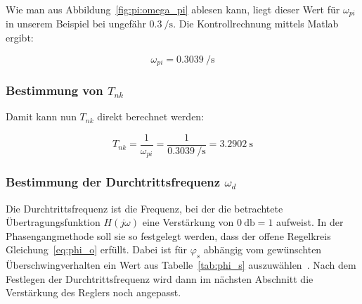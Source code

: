 Wie    man   aus    Abbildung~\ref{fig:pi:omega_pi}   ablesen    kann,   liegt
dieser   Wert  f\"ur   $\omega_{pi}$  in   unserem  Beispiel   bei  ungef\"ahr
$\SI{0.3}{\per\second}$. Die Kontrollrechnung mittels Matlab ergibt:

\begin{equation} \label{eq:pi:omega_pi}
    \omega_{pi} = \SI{0.3039}{\per\second}
\end{equation}


\clearpage
\subsubsection{Bestimmung von $T_{nk}$}
Damit kann nun $T_{nk}$ direkt berechnet werden\footnotemark[5]:

\begin{equation} \label{eq:pi:omega_pi}
    T_{nk} = \frac{1}{\omega_{pi}} = \frac{1}{\SI{0.3039}{\per\second}} = \SI{3.2902}{\second}
\end{equation}



\subsubsection{Bestimmung der Durchtrittsfrequenz $\omega_d$}

Die   Durchtrittsfrequenz  ist   die   Frequenz,  bei   der  die   betrachtete
\"Ubertragungsfunktion $H(j\omega)$ eine Verst\"arkung von $\SI{0}{\decibel} =
1$  aufweist. In der  Phasengangmethode soll  sie so  festgelegt werden,  dass
der  offene  Regelkreis  Gleichung~\ref{eq:phi_o} erf\"ullt. Dabei  ist  f\"ur
$\varphi_s$ abh\"angig  vom gew\"unschten \"Uberschwingverhalten ein  Wert aus
Tabelle~\ref{tab:phi_s}  auszuw\"ahlen~\footnotemark[6].   Nach dem  Festlegen
der Durchtrittsfrequenz  wird dann  im n\"achsten Abschnitt  die Verst\"arkung
des Reglers noch angepasst.


